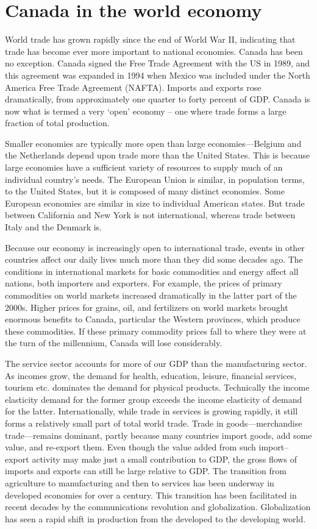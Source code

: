 \section{Canada in the world economy}\label{sec:ch15sec2}

World trade has grown rapidly since the end of World War II, indicating that trade has become ever more important to national economies. Canada has been no exception. Canada signed the Free Trade Agreement with the US in 1989, and this agreement was expanded in 1994 when Mexico was included under the North America Free Trade Agreement (NAFTA). Imports and exports rose dramatically, from approximately one quarter to forty percent of GDP. Canada is now what is termed a very `open' economy -- one where trade forms a large fraction of total production. 

Smaller economies are typically more open than large economies---Belgium and the Netherlands depend upon trade more than the United States. This is because large economies have a sufficient variety of resources to supply much of an individual country's needs. The European Union is similar, in population terms, to the United States, but it is composed of many distinct economies. Some European economies are similar in size to individual American states. But trade between California and New York is not international, whereas trade between Italy and the Denmark is. 

Because our economy is increasingly open to international trade, events in other countries affect our daily lives much more than they did some decades ago. The conditions in international markets for basic commodities and energy affect all nations, both importers and exporters. For example, the prices of primary commodities on world markets increased dramatically in the latter part of the 2000s. Higher prices for grains, oil, and fertilizers on world markets brought enormous benefits to Canada, particular the Western provinces, which produce these commodities. If these primary commodity prices fall to where they were at the turn of the millennium, Canada will lose considerably.

The service sector accounts for more of our GDP than the manufacturing sector. As incomes grow, the demand for health, education, leisure, financial services, tourism etc. dominates the demand for physical products. Technically the income elasticity demand for the former group exceeds the income elasticity of demand for the latter. Internationally, while trade in services is growing rapidly, it still forms a relatively small part of total world trade. Trade in goods---merchandise trade---remains dominant, partly because many countries import goods, add some value, and re-export them. Even though the value added from such import--export activity may make just a small contribution to GDP, the gross flows of imports and exports can still be large relative to GDP. The transition from agriculture to manufacturing and then to services has been underway in developed economies for over a century. This transition has been facilitated in recent decades by the communications revolution and globalization. Globalization has seen a rapid shift in production from the developed to the developing world. 

